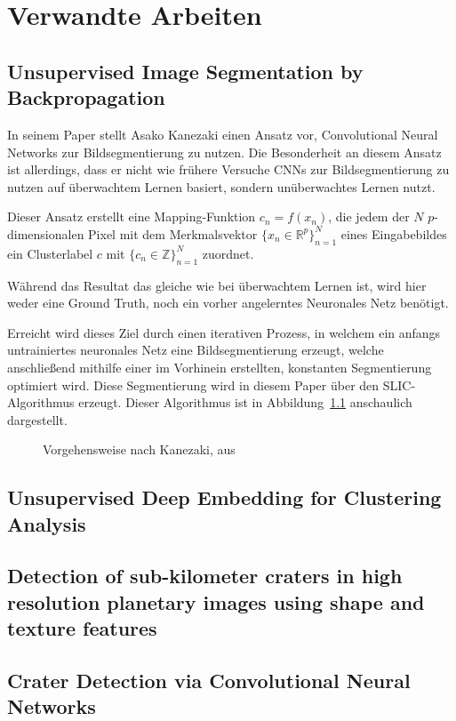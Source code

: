 \chapter{Verwandte Arbeiten}
\label{chap:verwarbeiten}

\section{Unsupervised Image Segmentation by Backpropagation}
\label{sec:kanezaki}
In seinem Paper \cite{kanezaki} stellt Asako Kanezaki einen Ansatz vor, Convolutional Neural Networks zur Bildsegmentierung zu nutzen. Die Besonderheit an diesem Ansatz ist allerdings, dass er nicht wie frühere Versuche CNNs zur Bildsegmentierung zu nutzen auf überwachtem Lernen basiert, sondern unüberwachtes Lernen nutzt.

Dieser Ansatz erstellt eine Mapping-Funktion $c_n=f(x_n)$, die jedem der $N$ $p$-dimensionalen Pixel mit dem Merkmalsvektor $\{x_n\in\mathbb{R}^p\}_{n=1}^N$ eines Eingabebildes ein Clusterlabel $c$ mit $\{c_n\in\mathbb{Z}\}_{n=1}^N$ zuordnet.

Während das Resultat das gleiche wie bei überwachtem Lernen ist, wird hier weder eine Ground Truth, noch ein vorher angelerntes Neuronales Netz benötigt.

Erreicht wird dieses Ziel durch einen iterativen Prozess, in welchem ein anfangs untrainiertes neuronales Netz eine Bildsegmentierung erzeugt, welche anschließend mithilfe einer im Vorhinein erstellten, konstanten Segmentierung optimiert wird. Diese Segmentierung wird in diesem Paper über den SLIC-Algorithmus\cite{slic} erzeugt. Dieser Algorithmus ist in Abbildung~\ref{fig:kanezaki_flowchart} anschaulich dargestellt.

\begin{figure}
	\caption{Vorgehensweise nach Kanezaki, aus \cite{kanezaki}}
	\label{fig:kanezaki_flowchart}
\end{figure}

\section{Unsupervised Deep Embedding for Clustering Analysis}
\label{sec:unsupervised_dec}
\cite{unsupervised_dec}

\section{Detection of sub-kilometer craters in high resolution planetary images using shape and texture features}
\label{sec:bandeira}
\cite{bandeira}

\section{Crater Detection via Convolutional Neural Networks}
\label{sec:crater_cnn}
\cite{crater_cnn}